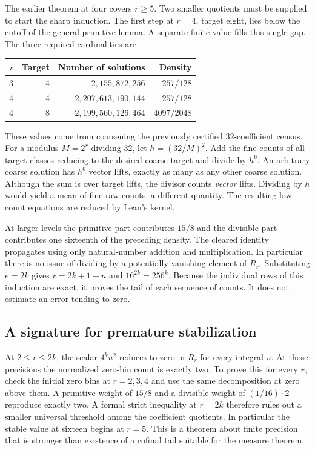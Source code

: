 \documentclass[12pt,letterpaper]{article}
\begin{document}
The earlier theorem at four covers $r\ge5$. Two smaller quotients must be supplied to start the sharp induction. The first step at $r=4$, target eight, lies below the cutoff of the general primitive lemma. A separate finite value fills this single gap. The three required cardinalities are
\begin{center}\small\begin{tabular}{rrrr}\toprule
$r$ & Target & Number of solutions & Density\\\midrule
3 & 4 & $2{,}155{,}872{,}256$ & $257/128$\\
4 & 4 & $2{,}207{,}613{,}190{,}144$ & $257/128$\\
4 & 8 & $2{,}199{,}560{,}126{,}464$ & $4097/2048$\\\bottomrule
\end{tabular}\end{center}
These values come from coarsening the previously certified $32$-coefficient census. For a modulus $M=2^r$ dividing $32$, let $h=(32/M)^2$. Add the fine counts of all target classes reducing to the desired coarse target and divide by $h^6$. An arbitrary coarse solution has $h^6$ vector lifts, exactly as many as any other coarse solution. Although the sum is over target lifts, the divisor counts \emph{vector} lifts. Dividing by $h$ would yield a mean of fine raw counts, a different quantity. The resulting low-count equations are reduced by Lean's kernel.

At larger levels the primitive part contributes $15/8$ and the divisible part contributes one sixteenth of the preceding density. The cleared identity propagates using only natural-number addition and multiplication. In particular there is no issue of dividing by a potentially vanishing element of $R_r$. Substituting $e=2k$ gives $r=2k+1+n$ and $16^{2k}=256^k$. Because the individual rows of this induction are exact, it proves the tail of each sequence of counts. It does not estimate an error tending to zero.

\subsection{A signature for premature stabilization}
At $2\leq r\leq2k$, the scalar $4^k u^2$ reduces to zero in $R_r$ for every integral $u$. At those precisions the normalized zero-bin count is exactly two. To prove this for every $r$, check the initial zero bins at $r=2,3,4$ and use the same decomposition at zero above them. A primitive weight of $15/8$ and a divisible weight of $(1/16)\cdot2$ reproduce exactly two. A formal strict inequality at $r=2k$ therefore rules out a smaller universal threshold among the coefficient quotients. In particular the stable value at sixteen begins at $r=5$. This is a theorem about finite precision that is stronger than existence of a cofinal tail suitable for the measure theorem.
\end{document}
